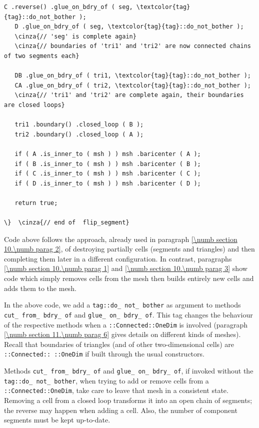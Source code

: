 \begin{Verbatim}[commandchars=\\\{\},formatcom=\small\tt,frame=single,
   label=parag-\ref{\numb section 10.\numb parag 3}.cpp,rulecolor=\color{moldura},
   baselinestretch=0.94,framesep=2mm]
   C .reverse() .glue_on_bdry_of ( seg, \textcolor{tag}{tag}::do_not_bother );
   D .glue_on_bdry_of ( seg, \textcolor{tag}{tag}::do_not_bother );
   \cinza{// 'seg' is complete again}
   \cinza{// boundaries of 'tri1' and 'tri2' are now connected chains of two segments each}
   
   DB .glue_on_bdry_of ( tri1, \textcolor{tag}{tag}::do_not_bother );
   CA .glue_on_bdry_of ( tri2, \textcolor{tag}{tag}::do_not_bother );
   \cinza{// 'tri1' and 'tri2' are complete again, their boundaries are closed loops}

   tri1 .boundary() .closed_loop ( B );
   tri2 .boundary() .closed_loop ( A );

   if ( A .is_inner_to ( msh ) ) msh .baricenter ( A );
   if ( B .is_inner_to ( msh ) ) msh .baricenter ( B );
   if ( C .is_inner_to ( msh ) ) msh .baricenter ( C );
   if ( D .is_inner_to ( msh ) ) msh .baricenter ( D );

   return true;

\}  \cinza{// end of  flip_segment}
\end{Verbatim}

Code above follows the approach, already used in paragraph \ref{\numb section 10.\numb parag 2},
of destroying partially cells (segments and triangles) and then completing them later
in a different configuration.
In contrast, paragraphs \ref{\numb section 10.\numb parag 1} and
\ref{\numb section 10.\numb parag 3} show code which simply removes cells from the mesh
then builds entirely new cells and adds them to the mesh.

In the above code, we add a {\small\tt\textcolor{tag}{tag}::do\_\,not\_\,bother} as argument
to methods {\small\tt cut\_\,from\_\,bdry\_\,of} and {\small\tt glue\_\,on\_\,bdry\_\,of}.
This tag changes the behaviour of the respective methods when a
{\small\tt{}::Connected::OneDim} is involved
(paragraph \ref{\numb section 11.\numb parag 6} gives details on different kinds of meshes).
Recall that boundaries of triangles (and of other two-dimensional cells) are
{\small\tt{}::Connected:: ::OneDim} if built through the usual constructors.

Methods {\small\tt cut\_\,from\_\,bdry\_\,of} and {\small\tt glue\_\,on\_\,bdry\_\,of},
if invoked without the {\small\tt\textcolor{tag}{tag}::do\_\,not\_\,bother},
when trying to add or remove cells from a {\small\tt{}::Connected::OneDim},
take care to leave that mesh in a consistent state.
Removing a cell from a closed loop transforms it into an open chain of segments;
the reverse may happen when adding a cell.
Also, the number of component segments must be kept up-to-date.

